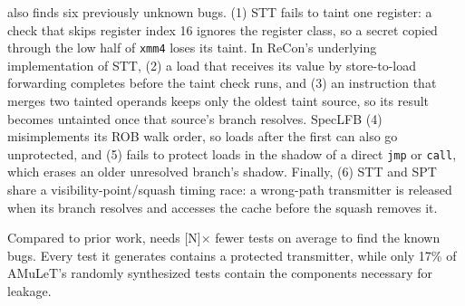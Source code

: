 \toolname{} also finds six previously unknown bugs. (1) STT fails to taint one register: a check that skips register index 16 ignores the register class, so a secret copied through the low half of \texttt{xmm4} loses its taint. In ReCon's underlying implementation of STT, (2) a load that receives its value by store-to-load forwarding completes before the taint check runs, and (3) an instruction that merges two tainted operands keeps only the oldest taint source, so its result becomes untainted once that source's branch resolves. SpecLFB (4) misimplements its ROB walk order, so loads after the first can also go unprotected, and (5) fails to protect loads in the shadow of a direct \texttt{jmp} or \texttt{call}, which erases an older unresolved branch's shadow. Finally, (6) STT and SPT share a visibility-point/squash timing race: a wrong-path transmitter is released when its branch resolves and accesses the cache before the squash removes it.
\urgentbr
{}
\notebr

Compared to prior work, \toolname{} needs [N]$\times$ fewer tests on average to find the known bugs. Every test it generates contains a protected transmitter, while only 17\% of AMuLeT's randomly synthesized tests contain the components necessary for leakage.


